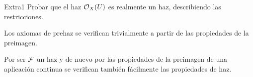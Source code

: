 \documentclass[twoside]{article}
\begin{document}
%
%
%
%
%
%
%
%
%
%
%
%
\begin{ejercicio}{Extra1}
Probar que el haz ${\mathcal O}_X(U)$ es realmente un haz, describiendo las restricciones. 
\end{ejercicio}
\begin{solucion}
Los axiomas de prehaz se verifican trivialmente a partir de las propiedades de la preimagen. 

Por ser $\mathcal{F}$ un haz y de nuevo por las propiedades de la preimagen de una aplicación continua se verifican también fácilmente las propiedades de haz.
\end{solucion}
%
%
%
%
%
%
%
%
%
%
\end{document}
